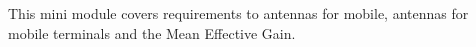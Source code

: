This mini module covers requirements to antennas for mobile, antennas for mobile terminals and the Mean Effective Gain.